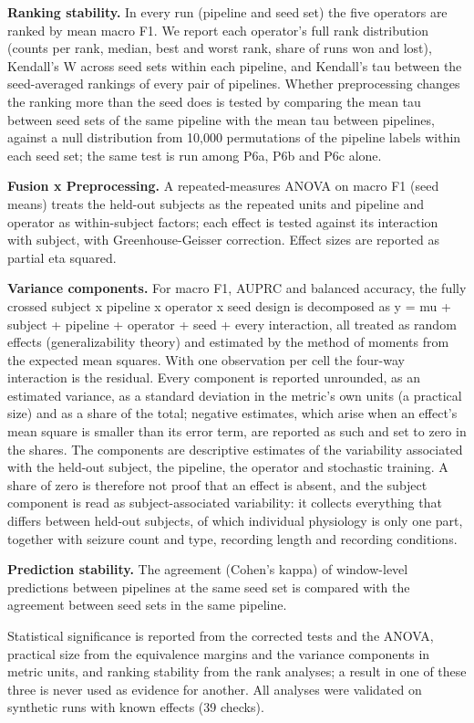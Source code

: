 \documentclass[11pt,a4paper]{article}
\begin{document}
\textbf{Ranking stability.} In every run (pipeline and seed set) the five operators are
ranked by mean macro F1. We report each operator's full rank distribution (counts per
rank, median, best and worst rank, share of runs won and lost), Kendall's W across
seed sets within each pipeline, and Kendall's tau between the seed-averaged rankings of
every pair of pipelines. Whether preprocessing changes the ranking more than the seed
does is tested by comparing the mean tau between seed sets of the same pipeline with
the mean tau between pipelines, against a null distribution from 10,000 permutations
of the pipeline labels within each seed set; the same test is run among P6a, P6b and
P6c alone.

\textbf{Fusion x Preprocessing.} A repeated-measures ANOVA on macro F1 (seed means) treats
the held-out subjects as the repeated units and pipeline and operator as within-subject
factors; each effect is tested against its interaction with subject, with
Greenhouse-Geisser correction. Effect sizes are reported as partial eta squared.

\textbf{Variance components.} For macro F1, AUPRC and balanced accuracy, the fully crossed
subject x pipeline x operator x seed design is decomposed as y = mu + subject +
pipeline + operator + seed + every interaction, all treated as random effects
(generalizability theory) and estimated by the method of moments from the expected
mean squares. With one observation per cell the four-way interaction is the residual.
Every component is reported unrounded, as an estimated variance, as a standard
deviation in the metric's own units (a practical size) and as a share of the total;
negative estimates, which arise when an effect's mean square is smaller than its error
term, are reported as such and set to zero in the shares. The components are
descriptive estimates of the variability associated with the held-out subject, the
pipeline, the operator and stochastic training. A share of zero is therefore not proof
that an effect is absent, and the subject component is read as subject-associated
variability: it collects everything that differs between held-out subjects, of which
individual physiology is only one part, together with seizure count and type, recording
length and recording conditions.

\textbf{Prediction stability.} The agreement (Cohen's kappa) of window-level predictions
between pipelines at the same seed set is compared with the agreement between seed
sets in the same pipeline.

Statistical significance is reported from the corrected tests and the ANOVA, practical
size from the equivalence margins and the variance components in metric units, and
ranking stability from the rank analyses; a result in one of these three is never
used as evidence for another. All analyses were validated on synthetic runs with known effects (39 checks).
\end{document}
